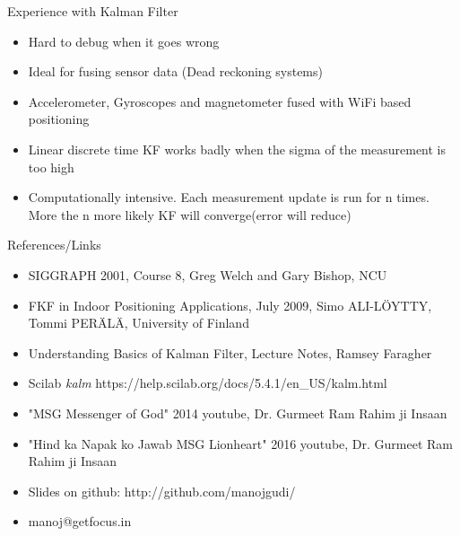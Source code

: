 \documentclass{beamer}
\begin{document}
\begin{frame}{Experience with Kalman Filter}
\begin{itemize}
  \item Hard to debug when it goes wrong
  \item Ideal for fusing sensor data (Dead reckoning systems)
  \item Accelerometer, Gyroscopes and magnetometer fused with WiFi based positioning
  \item Linear discrete time KF works badly when the sigma of the measurement is too high
  \item Computationally intensive. Each measurement update is run for n times. More the n more likely KF will converge(error will reduce)
\end{itemize}
\vskip 1cm
\end{frame}

\begin{frame}{References/Links}

\begin{itemize}
  \item SIGGRAPH 2001, Course 8, Greg Welch and Gary Bishop, NCU
  \item FKF in Indoor Positioning Applications, July 2009, Simo ALI-LÖYTTY, Tommi PERÄLÄ, University of Finland
  \item Understanding Basics of Kalman Filter, Lecture Notes, Ramsey Faragher
  \item Scilab \textit{kalm} https://help.scilab.org/docs/5.4.1/en\_US/kalm.html
  \item "MSG Messenger of God" 2014 youtube, Dr. Gurmeet Ram Rahim ji Insaan
  \item "Hind ka Napak ko Jawab MSG Lionheart" 2016 youtube, Dr. Gurmeet Ram Rahim ji Insaan
  \item Slides on github: http://github.com/manojgudi/
  \item manoj@getfocus.in
\end{itemize}

\vskip 1cm

\end{frame}
\end{document}
